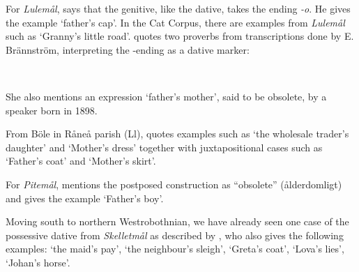 {For \textit{Lulemål}, \citet{Nordström1925} says that the genitive, like the dative, takes the ending\textit{ {}-o}. He gives the example  ‘father’s cap’. In the Cat Corpus, there are examples from \textit{Lulemål} such as  ‘Granny’s little road’.  \citet[163]{Källskog1992} quotes two proverbs from transcriptions done by E. Brännström, interpreting the -ending as a dative marker: 

\ea\label{}
\\

\z 
\z

She also mentions an expression  ‘father’s mother’, said to be obsolete, by a speaker born in 1898.

From Böle in Råneå parish (Ll), \citet[113]{Wikberg2004} quotes examples such as  ‘the wholesale trader’s daughter’ and  ‘Mother’s dress’ together with juxtapositional cases such as  ‘Father’s coat’ and  ‘Mother’s skirt’.

For \textit{Pitemål}, \citet[11]{Brännström1993} mentions the postposed construction as “obsolete” (ålderdomligt) and gives the example  ‘Father’s boy’. 

Moving south to northern Westrobothnian, we have already seen one case of the possessive dative from \textit{Skelletmål} as described by \citet[22]{Marklund1976}, who also gives the following examples:  ‘the maid’s pay’,  ‘the neighbour’s sleigh’,  ‘Greta’s coat’,  ‘Lova’s lies’, ‘Johan’s horse’. 

}
